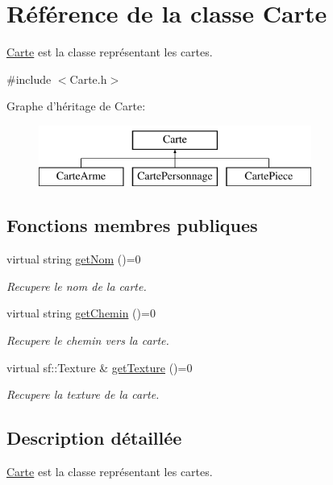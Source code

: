 \hypertarget{classCarte}{\section{\-Référence de la classe \-Carte}
\label{classCarte}
}


\hyperlink{classCarte}{\-Carte} est la classe représentant les cartes.  




{\ttfamily \#include $<$\-Carte.\-h$>$}

\-Graphe d'héritage de \-Carte\-:\begin{figure}[H]
\begin{center}
\leavevmode
\includegraphics[height=2.000000cm]{classCarte}
\end{center}
\end{figure}
\subsection*{\-Fonctions membres publiques}
\begin{DoxyCompactItemize}
\item 
virtual string \hyperlink{classCarte_af8021536db59b0333f4f7dd6c459f781}{get\-Nom} ()=0
\begin{DoxyCompactList}\small\item\em \-Recupere le nom de la carte. \end{DoxyCompactList}\item 
virtual string \hyperlink{classCarte_a2ea2b73f93967e0e9ca2da9c7a1b17f1}{get\-Chemin} ()=0
\begin{DoxyCompactList}\small\item\em \-Recupere le chemin vers la carte. \end{DoxyCompactList}\item 
virtual sf\-::\-Texture \& \hyperlink{classCarte_ad881bc9e55ab5feb4884d0efdcbf46ed}{get\-Texture} ()=0
\begin{DoxyCompactList}\small\item\em \-Recupere la texture de la carte. \end{DoxyCompactList}\end{DoxyCompactItemize}


\subsection{\-Description détaillée}
\hyperlink{classCarte}{\-Carte} est la classe représentant les cartes. 

